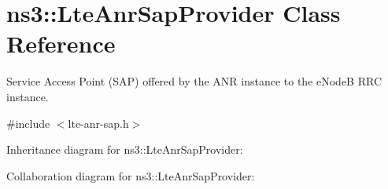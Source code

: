 \hypertarget{classns3_1_1LteAnrSapProvider}{}\section{ns3\+:\+:Lte\+Anr\+Sap\+Provider Class Reference}
\label{classns3_1_1LteAnrSapProvider}


Service Access Point (S\+AP) offered by the A\+NR instance to the e\+NodeB R\+RC instance.  




{\ttfamily \#include $<$lte-\/anr-\/sap.\+h$>$}



Inheritance diagram for ns3\+:\+:Lte\+Anr\+Sap\+Provider\+:


Collaboration diagram for ns3\+:\+:Lte\+Anr\+Sap\+Provider\+:
